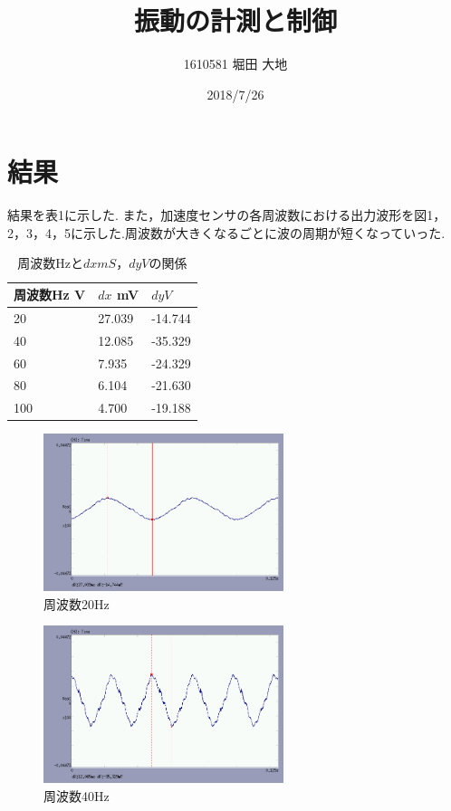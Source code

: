 \documentclass[twocolumn, 10pt, a4j]{jsarticle}
\title{\vspace{-2.5cm}振動の計測と制御}
\author{1610581 堀田 大地}
\date{2018/7/26}
\begin{document}
  \maketitle{}
  \section{結果}
    結果を表1に示した. また，加速度センサの各周波数における出力波形を図1，2，3，4，5に示した.周波数が大きくなるごとに波の周期が短くなっていった.
    \begin{table}[]
      \centering
        \caption{周波数Hzと$dx mS， dy V$の関係}
        \label{my-label}
        \footnotesize
        \begin{tabular}{lll}
          周波数Hz V & $dx$ mV& $dy V$ \\ \hline
          20 & 27.039 & -14.744 \\
          40 & 12.085 & -35.329 \\
          60 & 7.935 & -24.329 \\
          80 & 6.104 & -21.630 \\
          100 & 4.700 & -19.188 \\
        \end{tabular}
      \end{table}

      \begin{figure}[H]
        \begin{center}
          \includegraphics[width=7cm]{../img/experiments/001.png}
          \caption{周波数20Hz}
        \end{center}
      \end{figure}

      \begin{figure}[H]
        \begin{center}
          \includegraphics[width=7cm]{../img/experiments/002.png}
          \caption{周波数40Hz}
        \end{center}
      \end{figure}
\end{document}
